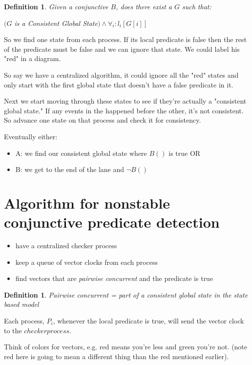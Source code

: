 \documentclass[twoside]{article}
\newtheorem{definition}[theorem]{Definition}
\begin{document}
\begin{definition}
Given a conjunctive $B$, does there exist a $G$ such that:

$(G$ is a \textit{Consistent Global State}$) \land \forall_i : l_i [G[i]]$
\end{definition}

So we find one state from each process. If its local predicate is false then the rest of the predicate must be false and we can ignore that state. We could label his "red" in a diagram.

So say we have a centralized algorithm, it could ignore all the "red" states and only start with the first global state that doesn't have a false predicate in it.

Next we start moving through these states to see if they're actually a "consistent global state." If any events in the happened before the other, it's not consistent. So advance one state on that process and check it for consistency.

Eventually either:
\begin{itemize}
    \item A: we find our consistent global state where $B()$ is true OR
    \item B: we get to the end of the lane and $\neg B()$
\end{itemize}

\section{Algorithm for nonstable conjunctive predicate detection}

\begin{itemize}
    \item have a centralized checker process
    \item keep a queue of vector clocks from each process
    \item find vectors that are \textit{pairwise concurrent} and the predicate is true
\end{itemize}

\begin{definition}
Pairwise concurrent = part of a consistent global state in the state based model
\end{definition}

Each process, $P_i$, whenever the local predicate is true, will send the vector clock to the $checker process$.

Think of colors for vectors, e.g. red means you're less and green you're not. (note red here is going to mean a different thing than the red mentioned earlier).
\end{document}
